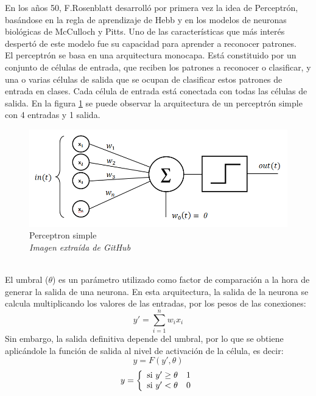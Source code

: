 En los años 50, F.Rosenblatt desarrolló por primera vez la idea de Perceptrón, basándose en la regla de aprendizaje de Hebb y en los modelos de neuronas biológicas de McCulloch y Pitts. Uno de las características que más interés despertó de este modelo fue su capacidad para aprender a reconocer patrones.\\
El perceptrón se basa en una arquitectura monocapa. Está constituido por un conjunto de células de entrada, que reciben los patrones a reconocer o clasificar, y una o varias células de salida que se ocupan de clasificar estos patrones de entrada en clases. Cada célula de entrada está conectada con todas las células de salida. En la figura \ref{perceptron} se puede observar la arquitectura de un perceptrón simple con 4 entradas y 1 salida.
\begin{figure}[htp]
\centering
\vspace{-1em}
\includegraphics[scale=0.5]{images/perceptron.png}
\caption{Perceptron simple\\\textit{Imagen extraída de GitHub}}
\label{perceptron}
\end{figure}
\\El umbral (${\theta}$) es un parámetro utilizado como factor de comparación a la hora de generar la salida de una neurona. En esta arquitectura, la salida de la neurona se calcula multiplicando los valores de las entradas, por los pesos de las conexiones:
\begin{equation}\label{prop_perceptron}
y' =  \sum_{i=1}^{n} w_{i}x_{i}
\end{equation}
Sin embargo, la salida definitiva depende del umbral, por lo que se obtiene aplicándole la función de salida al nivel de activación de la célula, es decir:
\begin{equation}\label{salida_perceptron}
y =  F(y', \theta)
\end{equation}
\begin{equation}\label{sistema}
y =
\left\lbrace
\begin{array}{ll}
\textup{si } y' \geq \theta & 1\\
\textup{si } y' < \theta & 0
\end{array}
\right.
\end{equation}
